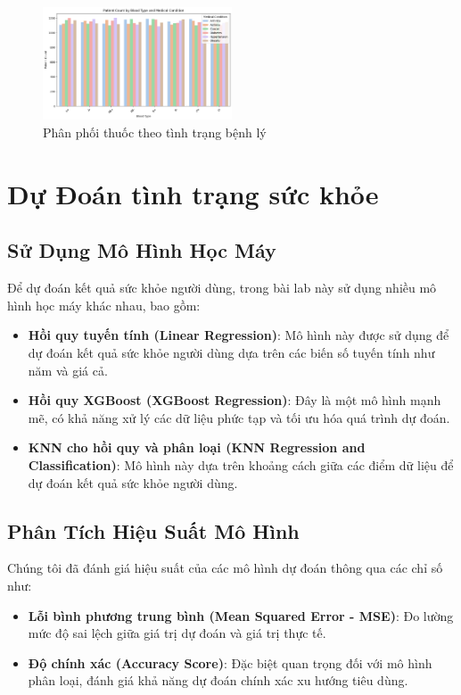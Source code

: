 \documentclass[a4paper,12pt]{report}
\begin{document}
\begin{figure}[hh]
    \centering
    \includegraphics[width=0.5\textwidth]{image/mevsbl.png}
    \caption{Phân phối thuốc theo tình trạng bệnh lý}
    \label{fig:mevsbl}
\end{figure}


\section{Dự Đoán tình trạng sức khỏe}

\subsection{Sử Dụng Mô Hình Học Máy}
Để dự đoán kết quả sức khỏe người dùng, trong bài lab này sử dụng nhiều mô hình học máy khác nhau, bao gồm:
\begin{itemize}
    \item \textbf{Hồi quy tuyến tính (Linear Regression)}: Mô hình này được sử dụng để dự đoán kết quả sức khỏe người dùng dựa trên các biến số tuyến tính như năm và giá cả.
    \item \textbf{Hồi quy XGBoost (XGBoost Regression)}: Đây là một mô hình mạnh mẽ, có khả năng xử lý các dữ liệu phức tạp và tối ưu hóa quá trình dự đoán.
    \item \textbf{KNN cho hồi quy và phân loại (KNN Regression and Classification)}: Mô hình này dựa trên khoảng cách giữa các điểm dữ liệu để dự đoán kết quả sức khỏe người dùng.
\end{itemize}

\subsection{Phân Tích Hiệu Suất Mô Hình}
Chúng tôi đã đánh giá hiệu suất của các mô hình dự đoán thông qua các chỉ số như:

\begin{itemize}
    \item \textbf{Lỗi bình phương trung bình (Mean Squared Error - MSE)}: Đo lường mức độ sai lệch giữa giá trị dự đoán và giá trị thực tế.
    \item \textbf{Độ chính xác (Accuracy Score)}: Đặc biệt quan trọng đối với mô hình phân loại, đánh giá khả năng dự đoán chính xác xu hướng tiêu dùng.
\end{itemize}
\end{document}
